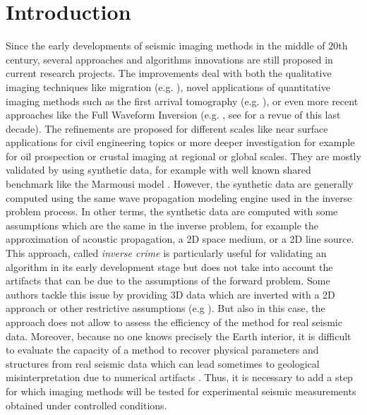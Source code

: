\documentclass[manuscript,revised]{geophysics}
\begin{document}
\modulolinenumbers[5]
\linenumbers

\section{Introduction}


\noindent Since the early developments of seismic imaging methods in the middle of 20th century, several approaches and algorithms innovations are still proposed in current research projects. The improvements deal with both the qualitative imaging techniques like migration (e.g. \citet{Berkhout_MSS_2012,Guofeng_GPU_2013}), novel applications of quantitative imaging methods such as the first arrival tomography (e.g. \citet{Bohm_CWS_2015}), or even more recent approaches like the Full Waveform Inversion (e.g. \citet{Perez_AWI_2014}, see \citet{Virieux_FWI_2009} for a revue of this last decade). The refinements are proposed for different scales like near surface applications for civil engineering topics or more deeper investigation for example for oil prospection or crustal imaging at regional or global scales. They are mostly validated by using synthetic data, for example with well known shared benchmark like the Marmousi model \citep{martin2006marmousi2}. However, the synthetic data are generally computed using the same wave propagation modeling engine used in the inverse problem process. In other terms, the synthetic data are computed with some assumptions which are the same in the inverse problem, for example the approximation of acoustic propagation, a 2D space medium, or a 2D line source. This approach, called \textit{inverse crime} \citep{Wirgin_TIC_2004} is particularly useful for validating an algorithm in its early development stage but does not take into account the artifacts that can be due to the assumptions of the forward problem. Some authors tackle this issue by providing 3D data which are inverted with a 2D approach or other restrictive assumptions (e.g ). But also in this case, the approach does not allow to assess the efficiency of the method for real seismic data. Moreover, because no one knows precisely the Earth interior, it is difficult to evaluate the capacity of a method to recover physical parameters and structures from real seismic data which can lead sometimes to geological misinterpretation due to numerical artifacts \citep{Morozov_ARF_2004}. Thus, it is necessary to add a step for which imaging methods will be tested for experimental seismic measurements obtained under controlled conditions.
\end{document}
